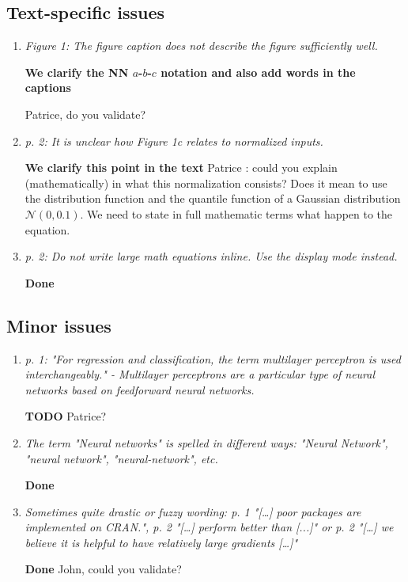 \documentclass[12pt]{article}
\newcommand{\red}[1]{{\color{red}#1}}
\begin{document}
\subsection*{Text-specific issues}

\begin{enumerate}[resume]
\item \textit{Figure 1: The figure caption does not describe the figure sufficiently well.}

\textbf{We clarify the NN $a$-$b$-$c$ notation and also add words in the captions}

\red{Patrice, do you validate?}

\item \textit{p. 2: It is unclear how Figure 1c relates to normalized inputs.}

\textbf{We clarify this point in the text}
\red{Patrice : could you explain (mathematically) in what this normalization consists? Does it mean to use the distribution
function and the quantile function of a Gaussian distribution $\mathcal N(0,0.1)$. We need to state in full mathematic
terms what happen to the equation.}

\item \textit{p. 2: Do not write large math equations inline. Use the display mode instead.}

\textbf{Done}

\end{enumerate}

\subsection*{Minor issues}

\begin{enumerate}[resume]
\item \textit{p. 1: "For regression and classification, the term multilayer perceptron is used interchangeably." - Multilayer perceptrons are a particular type of neural networks based on feedforward neural networks.}

\textbf{TODO}
\red{Patrice?}

\item \textit{The term "Neural networks" is spelled in different ways: "Neural Network", "neural network", "neural-network", etc.}

\textbf{Done}

 
\item \textit{Sometimes quite drastic or fuzzy wording: p. 1 "[…] poor packages are implemented on CRAN.", p. 2 "[…] perform better than [...]" or p. 2 "[…] we believe it is helpful to have relatively large gradients […]"}

\textbf{Done}
\red{John, could you validate?}

\end{enumerate}
\end{document}
